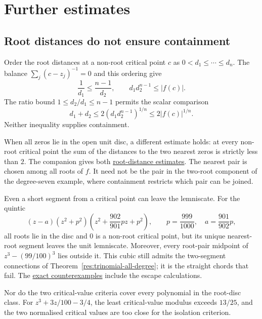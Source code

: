 \documentclass[11pt]{article}
\newcommand{\recordlink}[3]{\href{#1\##2}{#3}}
\begin{document}
\section{Further estimates}\label{sec:other-results}
\hypertarget{supplementary-results}{}

\subsection{Root distances do not ensure containment}\label{sec:critical-proximity}\label{sec:exact-obstructions}
\noindent{}\label{res:critical-proximity}
Order the root distances at a non-root critical point $c$ as
$0<d_1\le\cdots\le d_n$. The balance $\sum_j(c-z_j)^{-1}=0$ and
this ordering give
\[
 \frac1{d_1}\le\frac{n-1}{d_2},\qquad
 d_1d_2^{n-1}\le|f(c)|.
\]
The ratio bound $1\le d_2/d_1\le n-1$ permits the scalar comparison
\[
 d_1+d_2\le2(d_1d_2^{n-1})^{1/n}\le2|f(c)|^{1/n}.
\]
Neither inequality supplies containment.

\noindent{}\label{res:two-nearest-roots}
When all zeros lie in the open unit disc, a different estimate holds:
at every non-root critical point the sum of the distances to the two
nearest zeros is strictly less than $2$. The companion gives both
\recordlink{erdos1041-lemniscate-reasoning-surface.pdf}{root-distance-proofs}
{root-distance estimates}.
The nearest pair is chosen among all roots of $f$. It need not be the
pair in the two-root component of the degree-seven example, where
containment restricts which pair can be joined.

\noindent{}\label{res:straight-no-go}
Even a short segment from a critical point can leave the lemniscate.
For the quintic
\[
 (z-a)(z^2+p^2)\left(z^2+\frac{902}{901}pz+p^2\right),
 \qquad p=\frac{999}{1000},\quad a=\frac{901}{902}p,
\]
all roots lie in the disc and $0$ is a non-root critical point, but its
unique nearest-root segment leaves the unit lemniscate. Moreover, every
root-pair midpoint of $z^3-(99/100)^3$ lies outside it. This cubic still
admits the two-segment connections of Theorem~\ref{res:trinomial-all-degree};
it is the straight chords that fail. The
\recordlink{erdos1041-lemniscate-reasoning-surface.pdf}{straight-path-counterexamples}
{exact counterexamples} include the escape calculations.

\noindent{}\label{res:sep-or-false}
Nor do the two critical-value criteria cover every polynomial in the
root-disc class. For $z^3+3z/100-3/4$, the least critical-value modulus
exceeds $13/25$, and the two normalised critical values are too close
for the isolation criterion.
\end{document}
